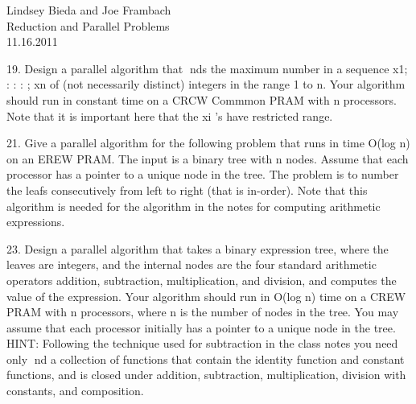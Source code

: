 \documentclass[10pt]{article}
\begin{document}
	\begin{flushright}
	Lindsey Bieda and Joe Frambach\\
	Reduction and Parallel Problems\\
	11.16.2011
	\end{flushright}

19. Design a parallel algorithm that nds the maximum number in a sequence x1; : : : ; xn of (not necessarily
distinct) integers in the range 1 to n. Your algorithm should run in constant time on a CRCW
Commmon PRAM with n processors. Note that it is important here that the xi
's have restricted
range.


21. Give a parallel algorithm for the following problem that runs in time O(log n) on an EREW PRAM.
The input is a binary tree with n nodes. Assume that each processor has a pointer to a unique node in
the tree. The problem is to number the leafs consecutively from left to right (that is in-order). Note
that this algorithm is needed for the algorithm in the notes for computing arithmetic expressions.


23. Design a parallel algorithm that takes a binary expression tree, where the leaves are integers, and the
internal nodes are the four standard arithmetic operators addition, subtraction, multiplication, and
division, and computes the value of the expression. Your algorithm should run in O(log n) time on a
CREW PRAM with n processors, where n is the number of nodes in the tree. You may assume that
each processor initially has a pointer to a unique node in the tree.
HINT: Following the technique used for subtraction in the class notes you need only nd a collection
of functions that contain the identity function and constant functions, and is closed under addition,
subtraction, multiplication, division with constants, and composition.
\end{document}
